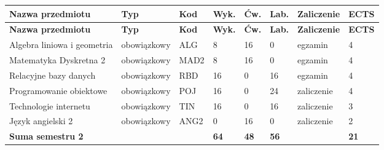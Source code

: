 \documentclass[12pt,a4paper]{article}
\newcommand{\thdrule}{\noalign{\global\setlength{\extrarowheight}{0pt}}}
\newcommand{\thdend}{\noalign{\global\setlength{\extrarowheight}{4pt}}}
\begin{document}
{\scriptsize
\begin{longtable}{m{5.0cm}m{1.9cm}m{0.75cm}m{0.85cm}m{0.85cm}m{0.85cm}m{1.45cm}m{0.9cm}}
\thdrule\toprule
\rowcolor{pjatkRed}
{\color{white}\footnotesize\textbf{\vphantom{Ag}Nazwa przedmiotu}} & {\color{white}\footnotesize\textbf{\vphantom{Ag}Typ}} & {\color{white}\footnotesize\textbf{\vphantom{Ag}Kod}} & {\color{white}\footnotesize\textbf{\vphantom{Ag}Wyk.}} & {\color{white}\footnotesize\textbf{\vphantom{Ag}Ćw.}} & {\color{white}\footnotesize\textbf{\vphantom{Ag}Lab.}} & {\color{white}\footnotesize\textbf{\vphantom{Ag}Zaliczenie}} & {\color{white}\footnotesize\textbf{\vphantom{Ag}ECTS}} \\
\midrule\thdend
\endfirsthead
\thdrule\toprule
\rowcolor{pjatkRed}
{\color{white}\footnotesize\textbf{\vphantom{Ag}Nazwa przedmiotu}} & {\color{white}\footnotesize\textbf{\vphantom{Ag}Typ}} & {\color{white}\footnotesize\textbf{\vphantom{Ag}Kod}} & {\color{white}\footnotesize\textbf{\vphantom{Ag}Wyk.}} & {\color{white}\footnotesize\textbf{\vphantom{Ag}Ćw.}} & {\color{white}\footnotesize\textbf{\vphantom{Ag}Lab.}} & {\color{white}\footnotesize\textbf{\vphantom{Ag}Zaliczenie}} & {\color{white}\footnotesize\textbf{\vphantom{Ag}ECTS}} \\
\midrule\thdend
\endhead
\rowcolor{tableRowLight} Algebra liniowa i geometria & {\scriptsize obowiązkowy} & ALG & 8 & 16 & 0 & {\scriptsize egzamin} & 4 \\
\rowcolor{tableRowAlt} Matematyka Dyskretna 2 & {\scriptsize obowiązkowy} & MAD2 & 8 & 16 & 0 & {\scriptsize egzamin} & 4 \\
\rowcolor{tableRowLight} Relacyjne bazy danych & {\scriptsize obowiązkowy} & RBD & 16 & 0 & 16 & {\scriptsize egzamin} & 4 \\
\rowcolor{tableRowAlt} Programowanie obiektowe & {\scriptsize obowiązkowy} & POJ & 16 & 0 & 24 & {\scriptsize zaliczenie} & 4 \\
\rowcolor{tableRowLight} Technologie internetu & {\scriptsize obowiązkowy} & TIN & 16 & 0 & 16 & {\scriptsize zaliczenie} & 3 \\
\rowcolor{tableRowAlt} Język angielski 2 & {\scriptsize obowiązkowy} & ANG2 & 0 & 16 & 0 & {\scriptsize zaliczenie} & 2 \\
\midrule[\heavyrulewidth]
\rowcolor{tableSummary} \textbf{Suma semestru 2} & & & \textbf{64} & \textbf{48} & \textbf{56} & & \textbf{21} \\
\bottomrule
\end{longtable}}

\end{document}
